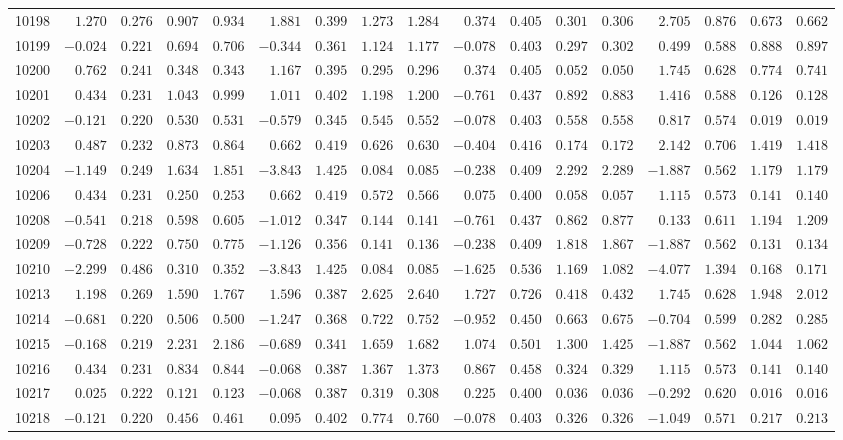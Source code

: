\documentclass[6pt]{article}
\begin{document}
\begin{landscape}
{\begin{longtable}{lrrrrrrrrrrrrrrrr}
10198&$ 1.270$&$0.276$&$0.907$&$0.934$&$ 1.881$&$0.399$&$1.273$&$1.284$&$ 0.374$&$0.405$&$0.301$&$0.306$&$ 2.705$&$0.876$&$0.673$&$0.662$\tabularnewline
10199&$-0.024$&$0.221$&$0.694$&$0.706$&$-0.344$&$0.361$&$1.124$&$1.177$&$-0.078$&$0.403$&$0.297$&$0.302$&$ 0.499$&$0.588$&$0.888$&$0.897$\tabularnewline
10200&$ 0.762$&$0.241$&$0.348$&$0.343$&$ 1.167$&$0.395$&$0.295$&$0.296$&$ 0.374$&$0.405$&$0.052$&$0.050$&$ 1.745$&$0.628$&$0.774$&$0.741$\tabularnewline
10201&$ 0.434$&$0.231$&$1.043$&$0.999$&$ 1.011$&$0.402$&$1.198$&$1.200$&$-0.761$&$0.437$&$0.892$&$0.883$&$ 1.416$&$0.588$&$0.126$&$0.128$\tabularnewline
10202&$-0.121$&$0.220$&$0.530$&$0.531$&$-0.579$&$0.345$&$0.545$&$0.552$&$-0.078$&$0.403$&$0.558$&$0.558$&$ 0.817$&$0.574$&$0.019$&$0.019$\tabularnewline
10203&$ 0.487$&$0.232$&$0.873$&$0.864$&$ 0.662$&$0.419$&$0.626$&$0.630$&$-0.404$&$0.416$&$0.174$&$0.172$&$ 2.142$&$0.706$&$1.419$&$1.418$\tabularnewline
10204&$-1.149$&$0.249$&$1.634$&$1.851$&$-3.843$&$1.425$&$0.084$&$0.085$&$-0.238$&$0.409$&$2.292$&$2.289$&$-1.887$&$0.562$&$1.179$&$1.179$\tabularnewline
10206&$ 0.434$&$0.231$&$0.250$&$0.253$&$ 0.662$&$0.419$&$0.572$&$0.566$&$ 0.075$&$0.400$&$0.058$&$0.057$&$ 1.115$&$0.573$&$0.141$&$0.140$\tabularnewline
10208&$-0.541$&$0.218$&$0.598$&$0.605$&$-1.012$&$0.347$&$0.144$&$0.141$&$-0.761$&$0.437$&$0.862$&$0.877$&$ 0.133$&$0.611$&$1.194$&$1.209$\tabularnewline
10209&$-0.728$&$0.222$&$0.750$&$0.775$&$-1.126$&$0.356$&$0.141$&$0.136$&$-0.238$&$0.409$&$1.818$&$1.867$&$-1.887$&$0.562$&$0.131$&$0.134$\tabularnewline
10210&$-2.299$&$0.486$&$0.310$&$0.352$&$-3.843$&$1.425$&$0.084$&$0.085$&$-1.625$&$0.536$&$1.169$&$1.082$&$-4.077$&$1.394$&$0.168$&$0.171$\tabularnewline
10213&$ 1.198$&$0.269$&$1.590$&$1.767$&$ 1.596$&$0.387$&$2.625$&$2.640$&$ 1.727$&$0.726$&$0.418$&$0.432$&$ 1.745$&$0.628$&$1.948$&$2.012$\tabularnewline
10214&$-0.681$&$0.220$&$0.506$&$0.500$&$-1.247$&$0.368$&$0.722$&$0.752$&$-0.952$&$0.450$&$0.663$&$0.675$&$-0.704$&$0.599$&$0.282$&$0.285$\tabularnewline
10215&$-0.168$&$0.219$&$2.231$&$2.186$&$-0.689$&$0.341$&$1.659$&$1.682$&$ 1.074$&$0.501$&$1.300$&$1.425$&$-1.887$&$0.562$&$1.044$&$1.062$\tabularnewline
10216&$ 0.434$&$0.231$&$0.834$&$0.844$&$-0.068$&$0.387$&$1.367$&$1.373$&$ 0.867$&$0.458$&$0.324$&$0.329$&$ 1.115$&$0.573$&$0.141$&$0.140$\tabularnewline
10217&$ 0.025$&$0.222$&$0.121$&$0.123$&$-0.068$&$0.387$&$0.319$&$0.308$&$ 0.225$&$0.400$&$0.036$&$0.036$&$-0.292$&$0.620$&$0.016$&$0.016$\tabularnewline
10218&$-0.121$&$0.220$&$0.456$&$0.461$&$ 0.095$&$0.402$&$0.774$&$0.760$&$-0.078$&$0.403$&$0.326$&$0.326$&$-1.049$&$0.571$&$0.217$&$0.213$\tabularnewline

\end{longtable}}
\end{landscape}
\end{document}
